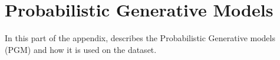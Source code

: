 \chapter{Probabilistic Generative Models}
In this part of the appendix, describes the Probabilistic Generative models (PGM) and how it is used on the dataset.
